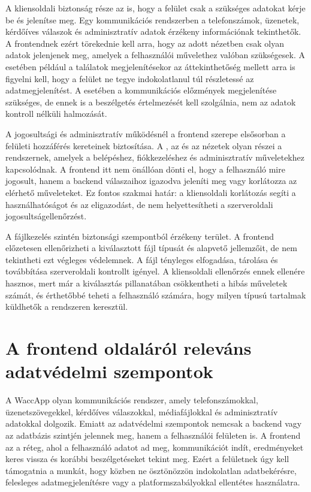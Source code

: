 A kliensoldali biztonság része az is, hogy a felület csak a szükséges adatokat kérje be és jelenítse meg. Egy kommunikációs rendszerben a telefonszámok, üzenetek, kérdőíves válaszok és adminisztratív adatok érzékeny információnak tekinthetők. A frontendnek ezért törekednie kell arra, hogy az adott nézetben csak olyan adatok jelenjenek meg, amelyek a felhasználói művelethez valóban szükségesek. A  esetében például a találatok megjelenítésekor az áttekinthetőség mellett arra is figyelni kell, hogy a felület ne tegye indokolatlanul túl részletessé az adatmegjelenítést. A  esetében a kommunikációs előzmények megjelenítése szükséges, de ennek is a beszélgetés értelmezését kell szolgálnia, nem az adatok kontroll nélküli halmozását. 

A jogosultsági és adminisztratív működésnél a frontend szerepe elsősorban a felületi hozzáférés kereteinek biztosítása. A , az  és az  nézetek olyan részei a rendszernek, amelyek a belépéshez, fiókkezeléshez és adminisztratív műveletekhez kapcsolódnak. A frontend itt nem önállóan dönti el, hogy a felhasználó mire jogosult, hanem a backend válaszaihoz igazodva jeleníti meg vagy korlátozza az elérhető műveleteket. Ez fontos szakmai határ: a kliensoldali korlátozás segíti a használhatóságot és az eligazodást, de nem helyettesítheti a szerveroldali jogosultságellenőrzést. 

A fájlkezelés szintén biztonsági szempontból érzékeny terület. A frontend előzetesen ellenőrizheti a kiválasztott fájl típusát és alapvető jellemzőit, de nem tekintheti ezt végleges védelemnek. A fájl tényleges elfogadása, tárolása és továbbítása szerveroldali kontrollt igényel. A kliensoldali ellenőrzés ennek ellenére hasznos, mert már a kiválasztás pillanatában csökkentheti a hibás műveletek számát, és érthetőbbé teheti a felhasználó számára, hogy milyen típusú tartalmak küldhetők a rendszeren keresztül. 

\section{A frontend oldaláról releváns adatvédelmi szempontok}

A WaccApp olyan kommunikációs rendszer, amely telefonszámokkal, üzenetszövegekkel, kérdőíves válaszokkal, médiafájlokkal és adminisztratív adatokkal dolgozik. Emiatt az adatvédelmi szempontok nemcsak a backend vagy az adatbázis szintjén jelennek meg, hanem a felhasználói felületen is. A frontend az a réteg, ahol a felhasználó adatot ad meg, kommunikációt indít, eredményeket keres vissza és korábbi beszélgetéseket tekint meg. Ezért a felületnek úgy kell támogatnia a munkát, hogy közben ne ösztönözzön indokolatlan adatbekérésre, felesleges adatmegjelenítésre vagy a platformszabályokkal ellentétes használatra.

